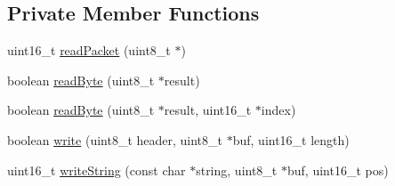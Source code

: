 \subsection*{Private Member Functions}
\begin{DoxyCompactItemize}
\item 
uint16\+\_\+t \hyperlink{class_cool_pub_sub_client_a25a8779149cfa809b7c06f63568b25cf}{read\+Packet} (uint8\+\_\+t $\ast$)
\item 
boolean \hyperlink{class_cool_pub_sub_client_ad409bbd287d5894f0cf082f62446c002}{read\+Byte} (uint8\+\_\+t $\ast$result)
\item 
boolean \hyperlink{class_cool_pub_sub_client_abef3735bb9a2a8c87b3da659dc4ade03}{read\+Byte} (uint8\+\_\+t $\ast$result, uint16\+\_\+t $\ast$index)
\item 
boolean \hyperlink{class_cool_pub_sub_client_a7a8e4854a1846eaa668046d3854d47ad}{write} (uint8\+\_\+t header, uint8\+\_\+t $\ast$buf, uint16\+\_\+t length)
\item 
uint16\+\_\+t \hyperlink{class_cool_pub_sub_client_a0e3d7e776d4cf4427f9569b28868905a}{write\+String} (const char $\ast$string, uint8\+\_\+t $\ast$buf, uint16\+\_\+t pos)
\end{DoxyCompactItemize}
